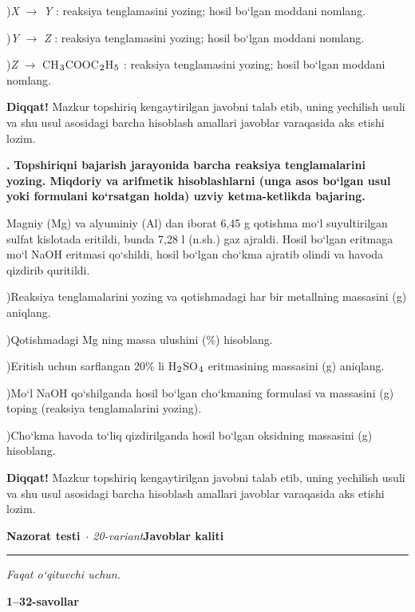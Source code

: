 \documentclass[11pt,a4paper]{article}
\renewcommand{\textsubscript}[1]{\ensuremath{_{\text{\fontsize{8}{8}\selectfont #1}}}}
\newcommand{\qn}[1]{\textbf{\fontsize{11.5}{13}\selectfont #1}}
\newcommand{\qsep}{\par\vspace{1pt}\noindent\rule{0pt}{0.4pt}\par\vspace{5pt}}
\newcommand{\diqqat}[1]{\par\smallskip\noindent\textbf{Diqqat!} #1\par\medskip}
\begin{document}
)\textit{X} $\to$ \textit{Y} : reaksiya tenglamasini yozing; hosil bo`lgan moddani nomlang.\par
{})\textit{Y} $\to$ \textit{Z} : reaksiya tenglamasini yozing; hosil bo`lgan moddani nomlang.\par
{})\textit{Z} $\to$ CH\textsubscript{3}COOC\textsubscript{2}H\textsubscript{5} : reaksiya tenglamasini yozing; hosil bo`lgan moddani nomlang.\par
\diqqat{Mazkur topshiriq kengaytirilgan javobni talab etib, uning yechilish usuli va shu usul asosidagi barcha hisoblash amallari javoblar varaqasida aks etishi lozim.}\qsep
\noindent\qn{43.} \textbf{Topshiriqni bajarish jarayonida barcha reaksiya tenglamalarini yozing. Miqdoriy va arifmetik hisoblashlarni (unga asos bo`lgan usul yoki formulani ko`rsatgan holda) uzviy ketma-ketlikda bajaring.}\par\smallskip
Magniy (Mg) va alyuminiy (Al) dan iborat 6,45 g qotishma mo`l suyultirilgan sulfat kislotada eritildi, bunda 7,28 l (n.sh.) gaz ajraldi. Hosil bo`lgan eritmaga mo`l NaOH eritmasi qo`shildi, hosil bo`lgan cho`kma ajratib olindi va havoda qizdirib quritildi.\par
{})Reaksiya tenglamalarini yozing va qotishmadagi har bir metallning massasini (g) aniqlang.\par
{})Qotishmadagi Mg ning massa ulushini (\%) hisoblang.\par
{})Eritish uchun sarflangan 20\% li H\textsubscript{2}SO\textsubscript{4} eritmasining massasini (g) aniqlang.\par
{})Mo`l NaOH qo`shilganda hosil bo`lgan cho`kmaning formulasi va massasini (g) toping (reaksiya tenglamalarini yozing).\par
{})Cho`kma havoda to`liq qizdirilganda hosil bo`lgan oksidning massasini (g) hisoblang.\par
\diqqat{Mazkur topshiriq kengaytirilgan javobni talab etib, uning yechilish usuli va shu usul asosidagi barcha hisoblash amallari javoblar varaqasida aks etishi lozim.}\qsep
\newpage
\noindent\textbf{\fontsize{13}{15}\selectfont Nazorat testi}\ \textit{$\cdot$ 20-variant}\hfill \textbf{Javoblar kaliti}\par\smallskip\hrule\smallskip
\textit{Faqat o`qituvchi uchun.}\par\medskip
\noindent\textbf{1--32-savollar}\par\smallskip
\end{document}
